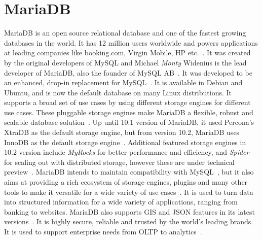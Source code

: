 \section{MariaDB}

MariaDB is an open source relational database and one of the fastest growing
databases in the world. It has 12 million users worldwide and powers
applications at leading companies like booking.com, Virgin Mobile, HP
etc.~\cite{hid-sp18-516-www-mariadb}. It was created by the original developers
of MySQL and Michael \textit{Monty} Widenius is the lead developer of MariaDB,
also the founder of MySQL AB~\cite{hid-sp18-516-www-wiki-mariadb}. It was
developed to be an enhanced, drop-in replacement for
MySQL~\cite{hid-sp18-516-www-mariadb-foundation}. It is available in Debian and
Ubuntu, and is now the default database on many Linux
distributions. It supports a broad set of use cases by using different storage
engines for different use cases. These pluggable storage engines make MariaDB a
flexible, robust and scalable database
solution~\cite{hid-sp18-516-www-mariadb-server}. Up until 10.1 version of
MariaDB, it used Percona's XtraDB as the default storage engine, but from
version 10.2, MariaDB uses InnoDB as the default storage
engine~\cite{hid-sp18-516-www-wiki-xtradb}. Additional featured storage engines
in 10.2 version include \textit{MyRocks} for better performance and efficiency,
and \textit{Spider} for scaling out with distributed storage, however these are
under technical preview~\cite{hid-sp18-516-www-mariadb-server}. MariaDB intends
to maintain compatibility with MySQL~\cite{hid-sp18-516-www-wiki-mariadb}, but
it also aims at providing a rich ecosystem of storage engines, plugins and many
other tools to make it versatile for a wide variety of use
cases~\cite{hid-sp18-516-www-mariadb-foundation}. It is used to turn data into
structured information for a wide variety of applications, ranging from banking
to websites. MariaDB also supports GIS and JSON features in its latest
versions~\cite{hid-sp18-516-www-mariadb-foundation}. It is highly secure,
reliable and trusted by the world's leading brands. It is used to support
enterprise needs from OLTP to analytics~\cite{hid-sp18-516-www-mariadb}.
